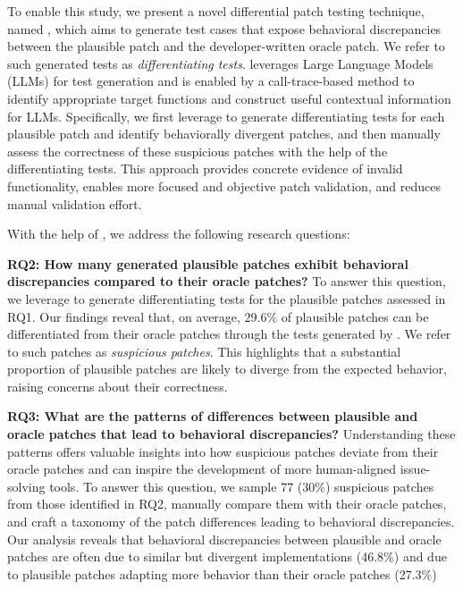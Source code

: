 To enable this study, we present a novel differential patch testing technique, named \appname, which aims to generate test cases that expose behavioral discrepancies between the plausible patch and the developer-written oracle patch.
We refer to such generated tests as \emph{differentiating tests}.
\appname leverages Large Language Models (LLMs) for test generation and is enabled by a call-trace-based method to identify appropriate target functions and construct useful contextual information for LLMs.
Specifically, we first leverage \appname to generate differentiating tests for each plausible patch and identify behaviorally divergent patches, and then manually assess the correctness of these suspicious patches with the help of the differentiating tests.
This approach provides concrete evidence of invalid functionality, enables more focused and objective patch validation, and reduces manual validation effort.




With the help of \appname, we address the following research questions: 

\noindent \textbf{RQ2: How many generated plausible patches exhibit behavioral discrepancies compared to their oracle patches?}
To answer this question, we leverage \appname to generate differentiating tests for the plausible patches assessed in RQ1.
Our findings reveal that, on average, 29.6\% of plausible patches can be differentiated from their oracle patches through the tests generated by \appname.
We refer to such patches as \emph{suspicious patches}.
This highlights that a substantial proportion of plausible patches are likely to diverge from the expected behavior, raising concerns about their correctness.

\noindent \textbf{RQ3: What are the patterns of differences between plausible and oracle patches that lead to behavioral discrepancies?}
Understanding these patterns offers valuable insights into how suspicious patches deviate from their oracle patches and can inspire the development of more human-aligned issue-solving tools.
To answer this question, 
we sample 77 (30\%) suspicious patches from those identified in RQ2, manually compare them with their oracle patches, and craft a taxonomy of the patch differences leading to behavioral discrepancies.
Our analysis reveals that behavioral discrepancies between plausible and oracle patches are often due to similar but divergent implementations (46.8\%) and due to plausible patches adapting more behavior than their oracle patches (27.3\%)

